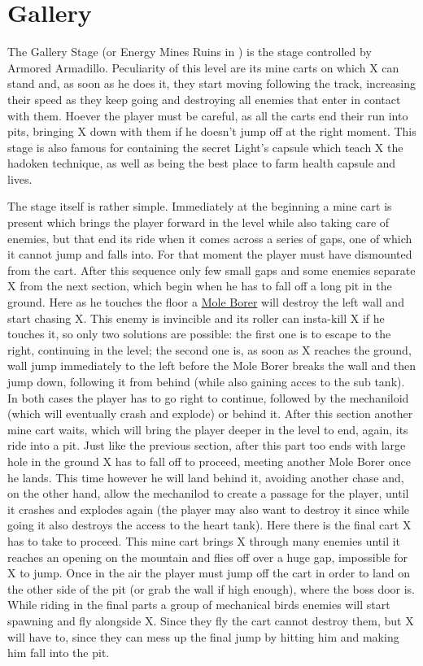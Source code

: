 \section{Gallery}
The Gallery Stage (or Energy Mines Ruins in \mhx) is the stage controlled by Armored Armadillo. Peculiarity of this level are its mine carts on which X can stand and, as soon as he does it, they start moving following the track, increasing their speed as they keep going and destroying all enemies that enter in contact with them. Hoever the player must be careful, as all the carts end their run into pits, bringing X down with them if he doesn't jump off at the right moment. This stage is also famous for containing the secret Light's capsule which teach X the hadoken technique, as well as being the best place to farm health capsule and lives.

The stage itself is rather simple. Immediately at the beginning a mine cart is present which brings the player forward in the level while also taking care of enemies, but that end its ride when it comes across a series of gaps, one of which it cannot jump and falls into. For that moment the player must have dismounted from the cart. After this sequence only few small gaps and some enemies separate X from the next section, which begin when he has to fall off a long pit in the ground. Here as he touches the floor a \hyperlink{miniboss:Mole_Borer}{Mole Borer} will destroy the left wall and start chasing X. This enemy is invincible and its roller can insta-kill X if he touches it, so only two solutions are possible: the first one is to escape to the right, continuing in the level; the second one is, as soon as X reaches the ground, wall jump immediately to the left before the Mole Borer breaks the wall and then jump down, following it from behind (while also gaining acces to the sub tank). In both cases the player has to go right to continue, followed by the mechaniloid (which will eventually crash and explode) or behind it. After this section another mine cart waits, which will bring the player deeper in the level to end, again, its ride into a pit. Just like the previous section, after this part too ends with large hole in the ground X has to fall off to proceed, meeting another Mole Borer once he lands. This time however he will land behind it, avoiding another chase and, on the other hand, allow the mechanilod to create a passage for the player, until it crashes and explodes again (the player may also want to destroy it since while going it also destroys the access to the heart tank). Here there is the final cart X has to take to proceed. This mine cart brings X through many enemies until it reaches an opening on the mountain and flies off over a huge gap, impossible for X to jump. Once in the air the player must jump off the cart in order to land on the other side of the pit (or grab the wall if high enough), where the boss door is. While riding in the final parts a group of mechanical birds enemies will start spawning and fly alongside X. Since they fly the cart cannot destroy them, but X will have to, since they can mess up the final jump by hitting him and making him fall into the pit.

